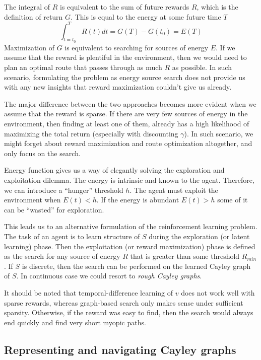 \documentclass[12pt]{article}
\begin{document}
The integral of $R$ is equivalent to the sum of future rewards $R$, which is the definition of return $G$. This is equal to the energy at some future time $T$
\[
\int_{t=t_0}^{T} R(t) dt = G(T) - G(t_0) = E(T)
\]
Maximization of $G$ is equivalent to searching for sources of energy $E$. If we assume that the reward is plentiful in the environment, then we would need to plan an optimal route that passes through as much $R$ as possible. In such scenario, formulating the problem as energy source search does not provide us with any new insights that reward maximization couldn't give us already. 

The major difference between the two approaches becomes more evident when we assume that the reward is sparse. If there are very few sources of energy in the environment, then finding at least one of them, already has a high likelihood of maximizing the total return (especially with discounting $\gamma$). In such scenario, we might forget about reward maximization and route optimization altogether, and only focus on the search. 

Energy function gives us a way of elegantly solving the exploration and exploitation dilemma. The energy is intrinsic and known to the agent. Therefore, we can introduce a ``hunger'' threshold $h$. The agent must exploit the environment when $E(t) < h$. If the energy is abundant $E(t)>h$ some of it can be ``wasted'' for exploration. 

This leads us to an alternative formulation of the reinforcement learning problem.
The task of an agent is to learn structure of $S$ during the exploration (or latent learning) phase. Then the exploitation (or reward maximization) phase is defined as the search for any source of energy $R$ that is greater than some threshold $R_{min}$. If $S$ is discrete, then the search can be performed on the learned Cayley graph of $S$. In continuous case we could resort to \textit{rough Cayley graphs}. 

It should be noted that temporal-difference learning of $v$ does not work well with sparse rewards, whereas graph-based search only makes sense under sufficient sparsity. Otherwise, if the reward was easy to find, then the search would always end quickly and find very short myopic paths.

\subsection{Representing and navigating Cayley graphs}
 
\end{document}
